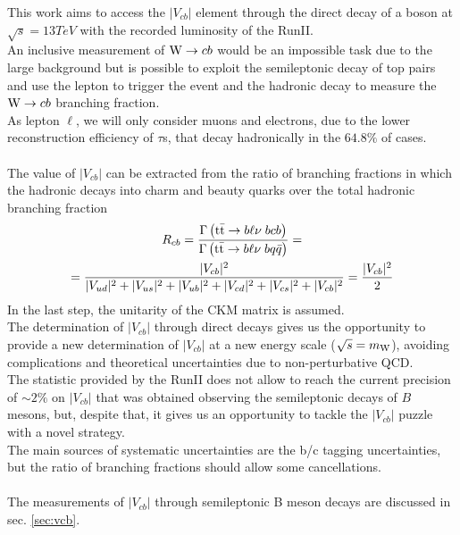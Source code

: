\label{sec:AN}
\minitoc

This work aims to access the $|V_{cb}|$ element through the direct decay of a \PW boson at $\sqrt{s}=13 TeV$ with the recorded luminosity of the RunII.\\
An inclusive measurement of ${\text{W}} \to cb$ would be an impossible task due to the large background but is possible to exploit the semileptonic decay of top pairs and use the lepton to trigger the event and the hadronic \PW decay to measure the ${\text{W}} \to cb$ branching fraction.\\
As lepton $\ell$, we will only consider muons and electrons, due to the lower reconstruction efficiency of $\tau$s, that decay hadronically in the $64.8\%$ of cases.
\\
\\
The value of $|V_{cb}|$ can be extracted from the ratio of branching fractions in which the hadronic \PW decays into charm and beauty quarks over the total \PW hadronic branching fraction
\begin{equation}
\begin{gathered}
    R_{cb}=\frac{\Gamma\left({{\text{t}}{\bar{\text{t}}}} \to b\ell \nu\; b cb\right)}{\Gamma\left({{\text{t}}{\bar{\text{t}}}} \to b\ell \nu\; b q\bar{q}\right)}=\\ =\frac{|V_{cb}|^2}{|V_{ud}|^2+|V_{us}|^2+|V_{ub}|^2+|V_{cd}|^2+|V_{cs}|^2+|V_{cb}|^2}=\frac{|V_{cb}|^2}{2}
\end{gathered}
\end{equation}
In the last step, the unitarity of the CKM matrix is assumed.\\
The determination of $|V_{cb}|$ through direct \PW decays gives us the opportunity to provide a new determination of $|V_{cb}|$ at a new energy scale ($\sqrt{s}=m_{{\text{W}}}$), avoiding complications and theoretical uncertainties due to non-perturbative QCD.\\
The statistic provided by the RunII does not allow to reach the current precision of $\sim2 \%$ on $|V_{cb}|$ that was obtained observing the semileptonic decays of $B$ mesons, but, despite that, it gives us an opportunity to tackle the $|V_{cb}|$ puzzle with a novel strategy.\\
The main sources of systematic uncertainties are the b/c tagging uncertainties, but the ratio of branching fractions should allow some cancellations.\\
\\
The measurements of $|V_{cb}|$ through semileptonic B meson decays are discussed in sec. \ref{sec:vcb}.

